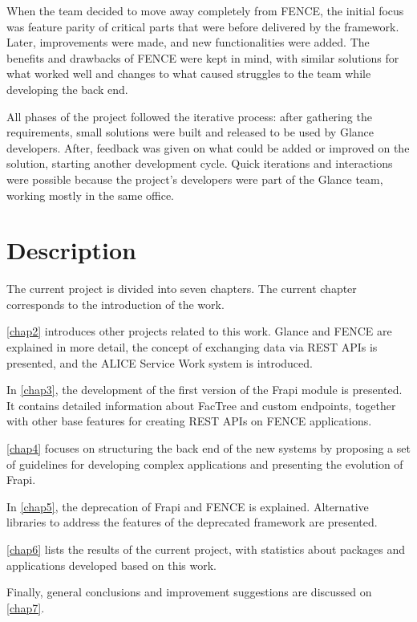 When the team decided to move away completely from FENCE, the initial focus was feature parity of critical parts that were before delivered by the framework. Later, improvements were made, and new functionalities were added. The benefits and drawbacks of FENCE were kept in mind, with similar solutions for what worked well and changes to what caused struggles to the team while developing the back end.

All phases of the project followed the iterative process: after gathering the requirements, small solutions were built and released to be used by Glance developers. After, feedback was given on what could be added or improved on the solution, starting another development cycle. Quick iterations and interactions were possible because the project’s developers were part of the Glance team, working mostly in the same office.

\section{Description}

The current project is divided into seven chapters. The current chapter corresponds to the introduction of the work.

\autoref{chap2} introduces other projects related to this work. Glance and FENCE are explained in more detail, the concept of exchanging data via REST APIs is presented, and the ALICE Service Work system is introduced.

In \autoref{chap3}, the development of the first version of the Frapi module is presented. It contains detailed information about FacTree and custom endpoints, together with other base features for creating REST APIs on FENCE applications.

\autoref{chap4} focuses on structuring the back end of the new systems by proposing a set of guidelines for developing complex applications and presenting the evolution of Frapi.

In \autoref{chap5}, the deprecation of Frapi and FENCE is explained. Alternative libraries to address the features of the deprecated framework are presented.

\autoref{chap6} lists the results of the current project, with statistics about packages and applications developed based on this work.

Finally, general conclusions and improvement suggestions are discussed on \autoref{chap7}.
